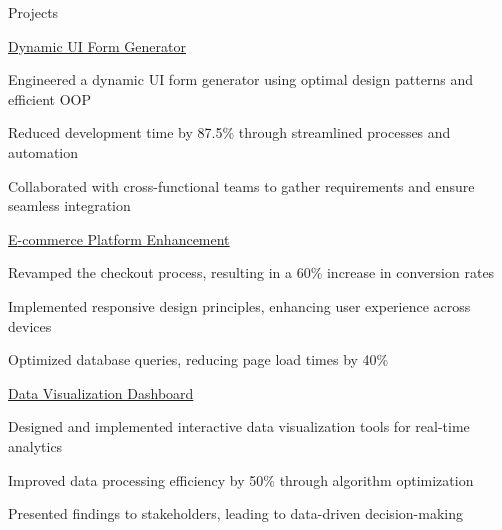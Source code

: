 \documentclass{resume} %
\begin{document}
    \begin{rSection}{Projects}
                    \begin{rSubsection}
                                    {\href{https://github.com/example/dynamic{-}ui{-}form{-}generator}{Dynamic UI Form Generator}}
                                {}{}{}
                                    \item Engineered a dynamic UI form generator using optimal design patterns and efficient OOP
                                    \item Reduced development time by 87.5\% through streamlined processes and automation
                                    \item Collaborated with cross{-}functional teams to gather requirements and ensure seamless integration
                            \end{rSubsection}
                    \begin{rSubsection}
                                    {\href{https://github.com/example/e{-}commerce{-}platform}{E{-}commerce Platform Enhancement}}
                                {}{}{}
                                    \item Revamped the checkout process, resulting in a 60\% increase in conversion rates
                                    \item Implemented responsive design principles, enhancing user experience across devices
                                    \item Optimized database queries, reducing page load times by 40\%
                            \end{rSubsection}
                    \begin{rSubsection}
                                    {\href{https://github.com/example/data{-}visualization{-}dashboard}{Data Visualization Dashboard}}
                                {}{}{}
                                    \item Designed and implemented interactive data visualization tools for real{-}time analytics
                                    \item Improved data processing efficiency by 50\% through algorithm optimization
                                    \item Presented findings to stakeholders, leading to data{-}driven decision{-}making
                            \end{rSubsection}
            \end{rSection}
\end{document}
